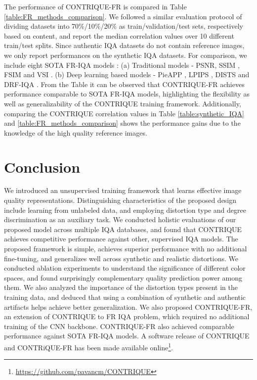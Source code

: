 \documentclass[journal]{IEEEtran}
\begin{document}
The performance of CONTRIQUE-FR is compared in Table \ref{table:FR_methods_comparison}. We followed a similar evaluation protocol of dividing datasets into 70\%/10\%/20\% as train/validation/test sets, respectively based on content, and report the median correlation values over 10 different train/test splits. Since authentic IQA datasets do not contain reference images, we only report performances on the synthetic IQA datasets. For comparison, we include eight SOTA FR-IQA models : (a) Traditional models - PSNR, SSIM \cite{wang2004image}, FSIM \cite{zhang2011fsim} and VSI \cite{zhang2014vsi}. (b) Deep learning based models - PieAPP \cite{prashnani2018pieapp}, LPIPS \cite{zhang2018unreasonable}, DISTS \cite{ding2020image} and DRF-IQA \cite{kim2020dynamic}. From the Table it can be observed that CONTRIQUE-FR achieves performance comparable to SOTA FR-IQA models, highlighting the flexibility as well as generalizability of the CONTRIQUE training framework. Additionally, comparing the CONTRIQUE correlation values in Table \ref{table:synthetic_IQA} and \ref{table:FR_methods_comparison} shows the performance gains due to the knowledge of the high quality reference images.

\section{Conclusion}
\label{sec:conclusion}
We introduced an unsupervised training framework that learns effective image quality representations. Distinguishing characteristics of the proposed design include learning from unlabeled data, and employing distortion type and degree discrimination as an auxiliary task. We conducted holistic evaluations of our proposed model across multiple IQA databases, and found that CONTRIQUE achieves competitive performance against other, supervised IQA models. The proposed framework is simple, achieves superior performance with no additional fine-tuning, and generalizes well across synthetic and realistic distortions. We conducted ablation experiments to understand the significance of different color spaces, and found surprisingly complementary quality prediction power among them. We also analyzed the importance of the distortion types present in the training data, and deduced that using a combination of synthetic and authentic artifacts helps achieve better generalization. We also proposed CONTRIQUE-FR, an extension of CONTRIQUE to FR IQA problem, which required no additional training of the CNN backbone. CONTRIQUE-FR also achieved comparable performance against SOTA FR-IQA models. A software release of CONTRIQUE and CONTRiQUE-FR has been made available online\footnote{\url{https://github.com/pavancm/CONTRIQUE}}.
\end{document}
